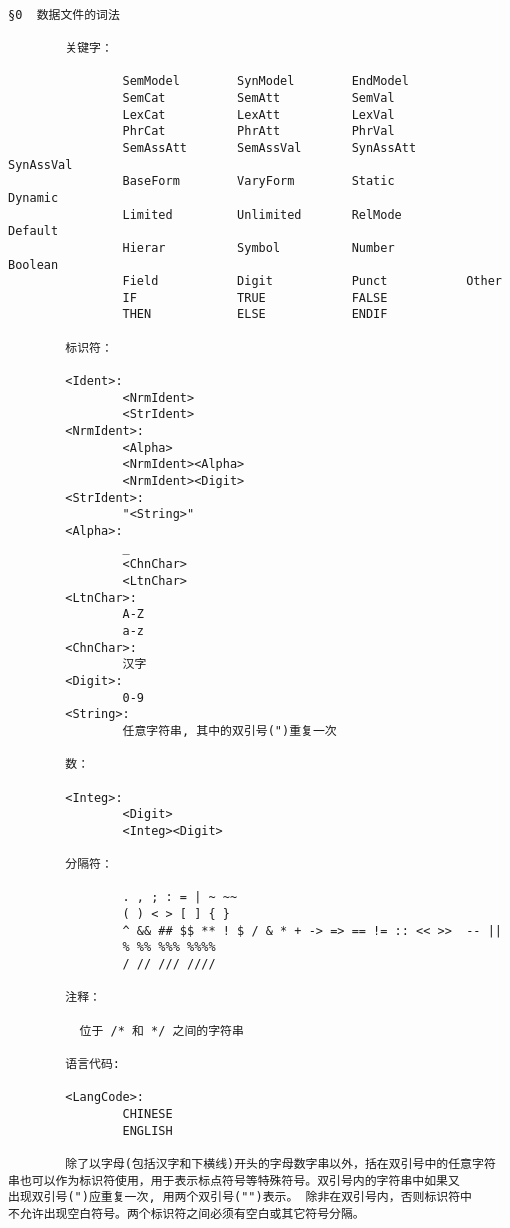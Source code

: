 \documentclass{article}
\begin{document}
\begin{CJK}{UTF8}{gbsn}
\begin{verbatim}

§0  数据文件的词法

        关键字：

                SemModel        SynModel        EndModel
                SemCat          SemAtt          SemVal
                LexCat          LexAtt          LexVal
                PhrCat          PhrAtt          PhrVal
                SemAssAtt       SemAssVal       SynAssAtt       SynAssVal
                BaseForm        VaryForm        Static          Dynamic
                Limited         Unlimited       RelMode         Default
                Hierar          Symbol          Number          Boolean
                Field           Digit           Punct           Other
                IF              TRUE            FALSE
                THEN            ELSE            ENDIF

        标识符：

        <Ident>:
                <NrmIdent>
                <StrIdent>
        <NrmIdent>:
                <Alpha>
                <NrmIdent><Alpha>
                <NrmIdent><Digit>
        <StrIdent>:
                "<String>"
        <Alpha>:
                _
                <ChnChar>
                <LtnChar>
        <LtnChar>:
                A-Z
                a-z
        <ChnChar>:
                汉字
        <Digit>:
                0-9
        <String>:
                任意字符串, 其中的双引号(")重复一次

        数：

        <Integ>:
                <Digit>
                <Integ><Digit>

        分隔符：

                . , ; : = | ~ ~~
                ( ) < > [ ] { }
                ^ && ## $$ ** ! $ / & * + -> => == != :: << >>  -- ||
                % %% %%% %%%%
                / // /// ////

        注释：

          位于 /* 和 */ 之间的字符串

        语言代码:

        <LangCode>:
                CHINESE
                ENGLISH

        除了以字母(包括汉字和下横线)开头的字母数字串以外，括在双引号中的任意字符
串也可以作为标识符使用，用于表示标点符号等特殊符号。双引号内的字符串中如果又
出现双引号(")应重复一次, 用两个双引号("")表示。 除非在双引号内，否则标识符中
不允许出现空白符号。两个标识符之间必须有空白或其它符号分隔。


\end{verbatim}
\end{CJK}
\end{document}
